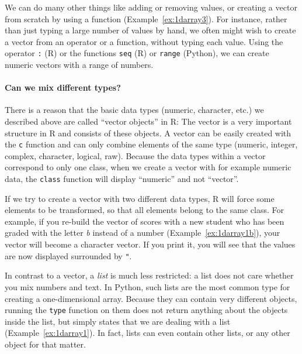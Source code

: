 
We can do many other things like adding or removing values, or creating a vector from scratch by using a
function (Example~\ref{ex:1darray3}). For instance, rather than just typing  a large number of values by hand, we often might
wish to create a vector from an operator or a function, without typing
each value. Using the operator \index{:}\texttt{:} (R) or the functions \texttt{seq} (R) or \texttt{range} (Python), we 
can create numeric vectors with
a range of numbers.


\paragraph[Can we mix different types?]{Can we mix different types?}
There is a reason that the basic data types (numeric, character, etc.) we described above are called
``vector objects'' in R: The vector is a very important structure in
R and consists of these objects. A vector can be easily created with the
\texttt{c} function and can only combine elements of the same type (numeric, integer, complex,
character, logical, raw).
Because the data types within a vector correspond to only one class,
when we create a vector with for example numeric data, the \texttt{class} function will display
``numeric'' and not ``vector''.

If we try to
create a vector with two different data types, R will 
force some elements to be transformed, so that all elements belong to the same
class. For example, if you re-build the vector of scores with a new student who has
been graded with the letter \emph{b} instead of a number (Example~\ref{ex:1darray1b}), your vector
will become a character vector. If you print it, you will see that the
values are now displayed surrounded by \verb|"|.




In contrast to a vector, a \emph{list} is much less restricted: a list does not care
whether you mix numbers and text. In Python, such lists are the most common type for creating
a one-dimensional array. Because they
can contain very different objects, running the \texttt{type} function on them
does not return anything about the objects inside the list, but simply states that we
are dealing with a list (Example~\ref{ex:1darray1}).
In fact, lists can even contain other lists, or any other object for
that matter.

